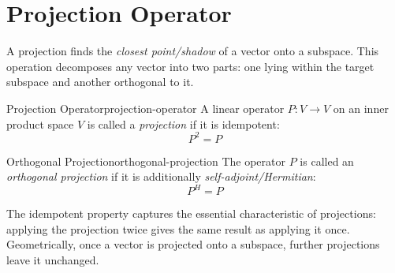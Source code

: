 \section{Projection Operator}
A projection finds the \emph{closest point/shadow} of a vector onto a subspace. This operation decomposes any vector into two parts: one lying within the target subspace and another orthogonal to it.

\begin{definition}{Projection Operator}{projection-operator}
    A linear operator $P: V \to V$ on an inner product space $V$ is called a \emph{projection} if it is idempotent:
    \[
        P^2 = P
    \]
\end{definition}

\begin{corollary}{Orthogonal Projection}{orthogonal-projection}
The operator $P$ is called an \emph{orthogonal projection} if it is additionally \emph{self-adjoint/Hermitian}:
\[
    P^H = P
\]
\end{corollary}

The idempotent property captures the essential characteristic of projections: applying the projection twice gives the same result as applying it once. Geometrically, once a vector is projected onto a subspace, further projections leave it unchanged.

